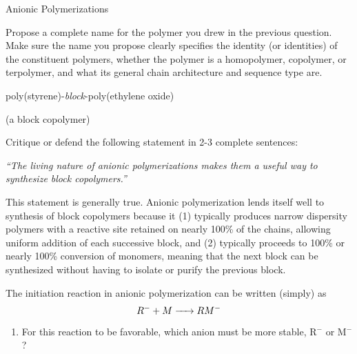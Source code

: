 \begin{activity}{Anionic Polymerizations}
\begin{ctqs}
	\question Propose a complete name for the polymer you drew in the previous question.  Make sure the name you propose clearly specifies the identity (or identities) of the constituent polymers, whether the polymer is a homopolymer, copolymer, or terpolymer, and what its general chain architecture and sequence type are. 
	
		\begin{solution}[1in]
			poly(styrene)-\emph{block}-poly(ethylene oxide)
			
			(a block copolymer)
		\end{solution}
		
	\question Critique or defend the following statement in 2-3 complete sentences:
	
		\emph{``The living nature of anionic polymerizations makes them a useful way to synthesize block copolymers.''}
		
		\begin{solution}[1.5in]
			This statement is generally true.  Anionic polymerization lends itself well to synthesis of block copolymers because it (1) typically produces narrow dispersity polymers with a reactive site retained on nearly 100\% of the chains, allowing uniform addition of each successive block, and (2) typically proceeds to 100\% or nearly 100\% conversion of monomers, meaning that the next block can be synthesized without having to isolate or purify the previous block.
		\end{solution}
	
\end{ctqs}


\begin{exercises}


	\exercise The initiation reaction in anionic polymerization can be written (simply) as %
		\begin{equation*}
			R^- + M \ce{->} RM^-
		\end{equation*}
		
		\begin{enumerate}
			\item For this reaction to be favorable, which anion must be more stable, R$^-$ or M$^-$?
			
				\begin{solution}\end{solution}
				

\end{enumerate}
\end{exercises}
\end{activity}
